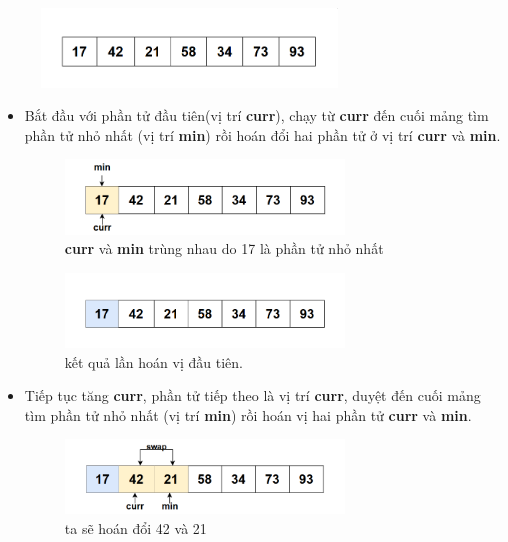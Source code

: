 \begin{figure}[H]
    \centering
    \includegraphics[width=0.7\textwidth]{img/selection sort/1.png}
    
\end{figure}

\begin{itemize}
\item Bắt đầu với phần tử đầu tiên(vị trí \textbf{curr}), chạy từ \textbf{curr} đến cuối mảng tìm phần tử nhỏ nhất (vị trí \textbf{min}) rồi hoán đổi hai phần tử ở vị trí \textbf{curr} và \textbf{min}. 
\begin{figure}[H]
    \centering
    \includegraphics[width=0.7\textwidth]{img/selection sort/2.png}
    \caption{\textbf{curr} và \textbf{min} trùng nhau do 17 là phần tử nhỏ nhất}
\end{figure}

\begin{figure}[H]
    \centering
    \includegraphics[width=0.7\textwidth]{img/selection sort/3.png}
    \caption{kết quả lần hoán vị đầu tiên.}
\end{figure}

\item Tiếp tục tăng \textbf{curr}, phần tử tiếp theo là vị trí \textbf{curr}, duyệt đến cuối mảng tìm phần tử nhỏ nhất (vị trí \textbf{min}) rồi hoán vị hai phần tử \textbf{curr} và \textbf{min}.

\begin{figure}[H]
    \centering
    \includegraphics[width=0.7\textwidth]{img/selection sort/4.png}
    \caption{ta sẽ hoán đổi 42 và 21}
\end{figure}


\end{itemize}
